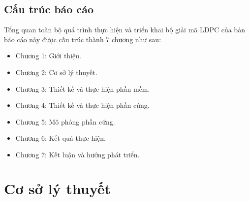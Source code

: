 \documentclass[12pt,a4paper,oneside]{book}
\begin{document}




\section{Cấu trúc báo cáo}
Tổng quan toàn bộ quá trình thực hiện và triển khai bộ giải mã LDPC của bản báo cáo này được cấu trúc thành 7 chương như sau:
\begin{itemize}
    \item[] Chương 1: Giới thiệu.
    \item[] Chương 2: Cơ sở lý thuyết.
    \item[] Chương 3: Thiết kế và thực hiện phần mềm.
    \item[] Chương 4: Thiết kế và thực hiện phần cứng.
    \item[] Chương 5: Mô phỏng phần cứng.
    \item[] Chương 6: Kết quả thực hiện.
    \item[] Chương 7: Kết luận và hướng phát triển.
\end{itemize}

\chapter{Cơ sở lý thuyết}
\end{document}
